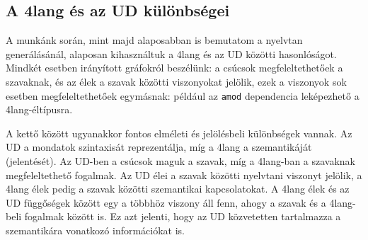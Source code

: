 \subsection{A 4lang és az UD különbségei}
\label{sec:4LvsUD}
A munkánk során, mint majd alaposabban is bemutatom a nyelvtan generálásánál, alaposan kihasználtuk a 4lang és az UD közötti hasonlóságot. Mindkét esetben irányított gráfokról beszélünk: a csúcsok megfeleltethetőek a szavaknak, és az élek a szavak közötti viszonyokat jelölik, ezek a viszonyok sok esetben megfeleltethetőek egymásnak: például az \texttt{amod} dependencia leképezhető a  4lang-éltípusra.

A kettő között ugyanakkor fontos elméleti és jelölésbeli különbségek vannak. Az UD a mondatok szintaxisát reprezentálja, míg a 4lang a szemantikáját (jelentését). Az UD-ben a csúcsok maguk a szavak, míg a 4lang-ban a szavaknak megfeleltethető fogalmak. Az UD élei a szavak közötti nyelvtani viszonyt jelölik, a 4lang élek pedig a szavak közötti szemantikai kapcsolatokat. A 4lang élek és az UD függőségek között egy a többhöz viszony áll fenn, ahogy a szavak és a 4lang-beli fogalmak között is. Ez azt jelenti, hogy az UD közvetetten tartalmazza a szemantikára vonatkozó információkat is.

